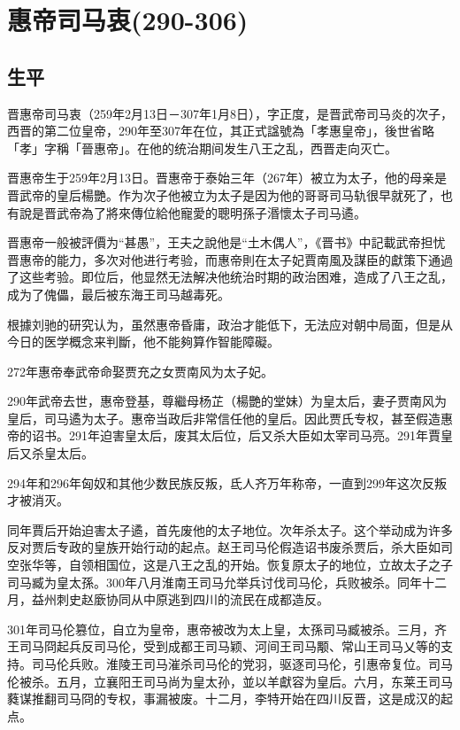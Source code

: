 
\section{惠帝司马衷\tiny(290-306)}

\subsection{生平}

晋惠帝司马衷（259年2月13日－307年1月8日），字正度，是晋武帝司马炎的次子，西晋的第二位皇帝，290年至307年在位，其正式諡號為「孝惠皇帝」，後世省略「孝」字稱「晉惠帝」。在他的统治期间发生八王之乱，西晋走向灭亡。

晋惠帝生于259年2月13日。晋惠帝于泰始三年（267年）被立为太子，他的母亲是晋武帝的皇后楊艷。作为次子他被立为太子是因为他的哥哥司马轨很早就死了，也有說是晋武帝為了將來傳位給他寵愛的聰明孫子湣懷太子司马遹。

晋惠帝一般被評價为“甚愚”，王夫之說他是“土木偶人”，《晋书》中記載武帝担忧晋惠帝的能力，多次对他进行考验，而惠帝則在太子妃賈南風及謀臣的獻策下通過了这些考验。即位后，他显然无法解决他统治时期的政治困难，造成了八王之乱，成为了傀儡，最后被东海王司马越毒死。

根據刘驰的研究认为，虽然惠帝昏庸，政治才能低下，无法应对朝中局面，但是从今日的医学概念来判斷，他不能夠算作智能障礙。

272年惠帝奉武帝命娶贾充之女贾南风为太子妃。

290年武帝去世，惠帝登基，尊繼母杨芷（楊艷的堂妹）为皇太后，妻子贾南风为皇后，司马遹为太子。惠帝当政后非常信任他的皇后。因此贾氏专权，甚至假造惠帝的诏书。291年迫害皇太后，废其太后位，后又杀大臣如太宰司马亮。291年賈皇后又杀皇太后。

294年和296年匈奴和其他少数民族反叛，氐人齐万年称帝，一直到299年这次反叛才被消灭。

同年賈后开始迫害太子遹，首先废他的太子地位。次年杀太子。这个举动成为许多反对贾后专政的皇族开始行动的起点。赵王司马伦假造诏书废杀贾后，杀大臣如司空张华等，自领相国位，这是八王之乱的开始。恢复原太子的地位，立故太子之子司马臧为皇太孫。300年八月淮南王司马允举兵讨伐司马伦，兵败被杀。同年十二月，益州刺史赵廞协同从中原逃到四川的流民在成都造反。

301年司马伦篡位，自立为皇帝，惠帝被改为太上皇，太孫司马臧被杀。三月，齐王司马冏起兵反司马伦，受到成都王司马颖、河间王司马颙、常山王司马乂等的支持。司马伦兵败。淮陵王司马漼杀司马伦的党羽，驱逐司马伦，引惠帝复位。司马伦被杀。五月，立襄阳王司马尚为皇太孙，並以羊獻容为皇后。六月，东莱王司马蕤谋推翻司马冏的专权，事漏被废。十二月，李特开始在四川反晋，这是成汉的起点。

